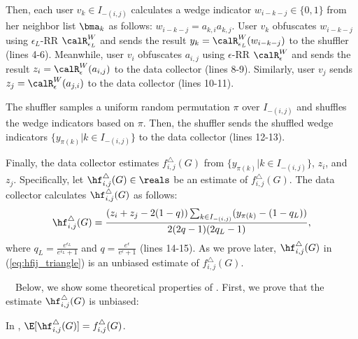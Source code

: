 Then, each user $v_k \in I_{-(i,j)}$ calculates a wedge indicator $w_{i-k-j} \in \{0,1\}$ from her neighbor list $\bma_k$ as follows: $w_{i-k-j} = a_{k,i} a_{k,j}$. 
User $v_k$ obfuscates $w_{i-k-j}$ using $\epsilon_L$-RR $\calR_{\epsilon_L}^W$ and sends the result $y_k = \calR_{\epsilon_L}^W(w_{i-k-j})$ to the shuffler (lines 4-6). 
Meanwhile, user $v_i$ obfuscates $a_{i,j}$ using $\epsilon$-RR $\calR_{\epsilon}^W$ and sends the result $z_i = \calR_{\epsilon}^W(a_{i,j})$ to the data collector 
(lines 8-9). 
Similarly, user $v_j$ sends $z_j = \calR_{\epsilon}^W(a_{j,i})$ to the data collector (lines 10-11). 

The shuffler samples a uniform random permutation $\pi$ over $I_{-(i,j)}$ and shuffles the wedge indicators based on $\pi$. 
Then, the shuffler sends the shuffled wedge indicators $\{y_{\pi(k)} | k \in I_{-(i,j)}\}$ to the data collector (lines 12-13). 

Finally, the data collector estimates $f_{i,j}^\triangle(G)$ from $\{y_{\pi(k)} | k \in I_{-(i,j)}\}$, $z_i$, and $z_j$. 
Specifically, let $\hf_{i,j}^\triangle(G) \in \reals$ be an estimate of $f_{i,j}^\triangle(G)$. 
The data collector calculates $\hf_{i,j}^\triangle(G)$ as follows: 
\begin{align}
    \hf_{i,j}^\triangle(G) = \frac{(z_i+z_j-2(1-q))\sum_{k \in I_{-(i,j)}} (y_{\pi(k)} - (1-q_L))}{2(2q-1)(2q_L-1)},
    \label{eq:hfij_triangle}
\end{align}
where $q_L = \frac{e^{\epsilon_L}}{e^{\epsilon_L}+1}$ and $q = \frac{e^\epsilon}{e^\epsilon+1}$ (lines 14-15). 
As we prove later, $\hf_{i,j}^\triangle(G)$ in (\ref{eq:hfij_triangle}) is an unbiased estimate of $f_{i,j}^\triangle(G)$. 

\smallskip
{}~~Below, we show some theoretical properties of \AlgWSLE{}. 
% 
First, we prove that 
the estimate $\hf_{i,j}^\triangle(G)$ 
is unbiased: 
\begin{theorem}
\label{thm:unbiased_I}
In \AlgWSLE{}, $\E[\hf_{i,j}^\triangle(G)] = f_{i,j}^\triangle(G)$. 
\end{theorem}

